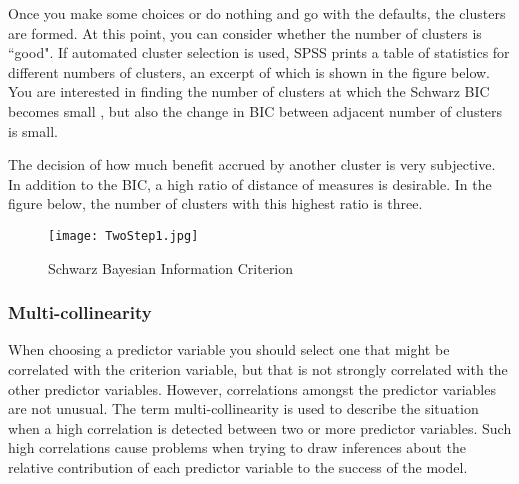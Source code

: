 \begin{frame}
Once you make some choices or do nothing and go with the defaults, the clusters are
formed. At this point, you can consider whether the number of clusters is ``good". If
automated cluster selection is used, SPSS prints a table of statistics for different
numbers of clusters, an excerpt of which is shown in the figure below. You are interested
in finding the number of clusters at which the Schwarz BIC becomes small , but also the change in BIC between
adjacent number of clusters is small. 

The decision of how much benefit accrued by another cluster is very subjective. In addition to the BIC, a high ratio of distance of measures is desirable. In the figure below, the number of clusters with this highest ratio is three.

\begin{figure}[h!]
\begin{centering}
  \texttt{[image: TwoStep1.jpg]}\\
  \caption{Schwarz Bayesian Information Criterion}
\end{centering}
\end{figure}
\end{frame}
\begin{frame}

\frametitle{Multi-collinearity}
When choosing a predictor variable you should select one that might be correlated with the criterion variable, but that is not strongly correlated with the other predictor variables. However, correlations amongst the predictor variables are not unusual. The term multi-collinearity  is used to describe the situation
when a high correlation is detected between two or more predictor variables.
Such high correlations cause problems when trying to draw inferences about the relative contribution of each predictor variable to the success of the model. 
\end{frame}
